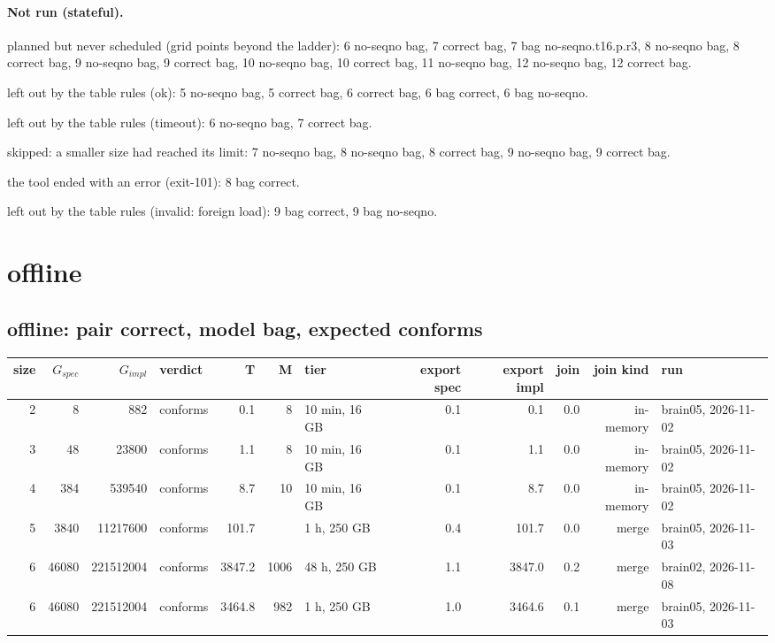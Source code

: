 \documentclass[10pt]{article}
\begin{document}
\paragraph{Not run (stateful).}
planned but never scheduled (grid points beyond the ladder): 6 no-seqno bag, 7 correct bag, 7 bag no-seqno.t16.p.r3, 8 no-seqno bag, 8 correct bag, 9 no-seqno bag, 9 correct bag, 10 no-seqno bag, 10 correct bag, 11 no-seqno bag, 12 no-seqno bag, 12 correct bag.\par
left out by the table rules (ok): 5 no-seqno bag, 5 correct bag, 6 correct bag, 6 bag correct, 6 bag no-seqno.\par
left out by the table rules (timeout): 6 no-seqno bag, 7 correct bag.\par
skipped: a smaller size had reached its limit: 7 no-seqno bag, 8 no-seqno bag, 8 correct bag, 9 no-seqno bag, 9 correct bag.\par
the tool ended with an error (exit-101): 8 bag correct.\par
left out by the table rules (invalid: foreign load): 9 bag correct, 9 bag no-seqno.\par
\section*{offline}
\subsection*{offline: pair \textsf{correct}, model bag, expected conforms}
\begin{longtable}{@{}rrrlrrlrrrrl@{}}
\toprule
size & $G_{\mathit{spec}}$ & $G_{\mathit{impl}}$ & verdict & T & M & tier & export spec & export impl & join & join kind & run \\
\midrule
\endhead
\color{red} 2 & 8 & 882 & conforms & 0.1 & 8 & 10 min, 16 GB & 0.1 & 0.1 & 0.0 & in-memory & brain05, 2026-11-02 \\
\color{red} 3 & 48 & 23800 & conforms & 1.1 & 8 & 10 min, 16 GB & 0.1 & 1.1 & 0.0 & in-memory & brain05, 2026-11-02 \\
\color{red} 4 & 384 & 539540 & conforms & 8.7 & 10 & 10 min, 16 GB & 0.1 & 8.7 & 0.0 & in-memory & brain05, 2026-11-02 \\
\color{blue} 5 & 3840 & 11217600 & conforms & 101.7 &  & 1 h, 250 GB & 0.4 & 101.7 & 0.0 & merge & brain05, 2026-11-03 \\
\color{blue} 6 & 46080 & 221512004 & conforms & 3847.2 & 1006 & 48 h, 250 GB & 1.1 & 3847.0 & 0.2 & merge & brain02, 2026-11-08 \\
\color{blue} 6 & 46080 & 221512004 & conforms & 3464.8 & 982 & 1 h, 250 GB & 1.0 & 3464.6 & 0.1 & merge & brain05, 2026-11-03 \\
\bottomrule
\end{longtable}
\end{document}
